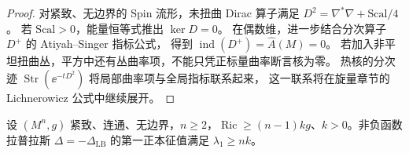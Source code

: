 \begin{proof}
对紧致、无边界的 Spin 流形，未扭曲 Dirac 算子满足
$D^2=\nabla^*\nabla+\mathrm{Scal}/4$。
若 $\mathrm{Scal}>0$，能量恒等式推出 $\ker D=0$。
在偶数维，进一步结合分次算子 $D^+$ 的 Atiyah--Singer 指标公式，
得到 $\operatorname{ind}(D^+)=\hat A(M)=0$。
若加入非平坦扭曲丛，平方中还有丛曲率项，不能只凭正标量曲率断言核为零。
热核的分次迹 $\operatorname{Str}(\ee^{-tD^2})$ 将局部曲率项与全局指标联系起来，
这一联系将在旋量章节的 Lichnerowicz 公式中继续展开。
\end{proof}

\begin{theorem}
设 $(M^n,g)$ 紧致、连通、无边界，$n\ge2$，$\operatorname{Ric}\ge(n-1)kg$、$k>0$。非负函数拉普拉斯 $\Delta=-\Delta_{\mathrm{LB}}$ 的第一正本征值满足 $\lambda_1\ge nk$。
\end{theorem}

